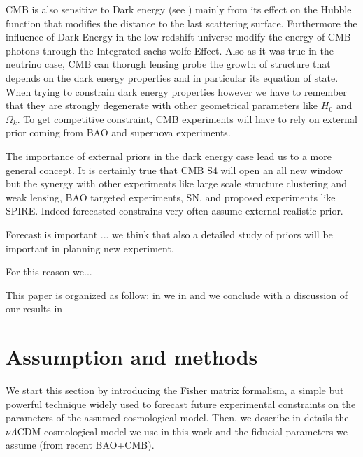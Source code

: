 \documentclass[aps,prl,preprint,groupedaddress]{revtex4-1}
\begin{document}
CMB is also sensitive to Dark energy (see \cite{2010MNRAS.405.2639J}) mainly from its effect on the Hubble function that modifies the distance to the last scattering surface. Furthermore the influence of Dark Energy in the low redshift universe modify the energy of CMB photons through the Integrated sachs wolfe Effect. Also as it was true in the neutrino case, CMB can thorugh lensing probe the growth of structure that depends on the dark energy properties and in particular its equation of state. When trying to constrain dark energy properties however we have to remember that they are strongly degenerate with other geometrical parameters like $H_{0}$ and $\Omega_{k}$. To get competitive constraint, CMB experiments will have to rely on external prior coming from BAO and supernova experiments.

The importance of external priors in the dark energy case lead us to a more general concept. It is certainly true that CMB S4 will open an all new window
but the synergy with other experiments like large scale structure clustering and weak lensing, BAO targeted experiments, SN, and proposed experiments like SPIRE. Indeed forecasted constrains very often assume external realistic prior.

Forecast is important \cite{wu:2014} ... we think that also a detailed study of priors will be important in planning new experiment.

For this reason we...

This paper is organized as follow: in  we in  and we conclude with a discussion of our results in 



\section{Assumption and methods \label{sec:methods} }
We start this section by introducing the Fisher matrix formalism, a simple but powerful technique widely used to forecast future experimental constraints on the parameters of the assumed cosmological model. Then, we describe in details the $\nu\Lambda$CDM cosmological model we use in this work and the fiducial parameters we assume (from recent BAO+CMB). 
\end{document}
